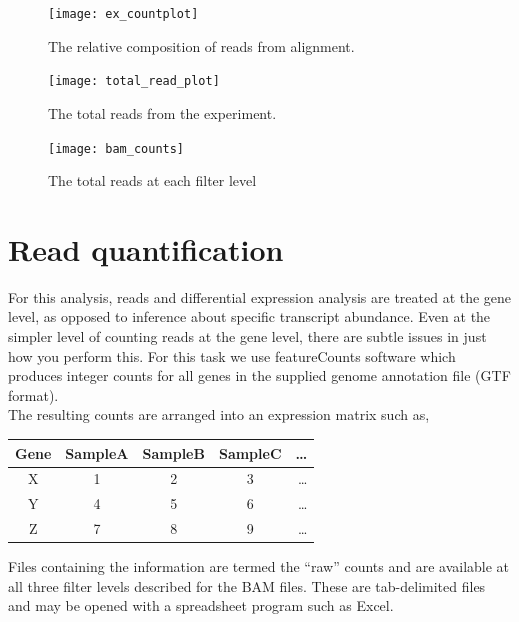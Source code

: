 \documentclass{article}
\begin{document}
\begin{figure}[ht!]
  \centering
    \texttt{[image: ex\_countplot]}
    \caption{The relative composition of reads from alignment.}
    \label{fig:relative_composition}
\end{figure}

\begin{figure}[ht!]
  \centering
    \texttt{[image: total\_read\_plot]}
    \caption{The total reads from the experiment.}
     \label{fig:total_counts}
\end{figure}

\begin{figure}[ht!]
  \centering
    \texttt{[image: bam\_counts]}
    \caption{The total reads at each filter level}
     \label{fig:bam_level_counts}
\end{figure}



\section{Read quantification}

For this analysis, reads and differential expression analysis are treated at the gene level, as opposed to inference about specific transcript abundance.  Even at the simpler level of counting reads at the gene level, there are subtle issues in just how you perform this.  For this task we use featureCounts software \cite{featureCounts} which produces integer counts for all genes in the supplied genome annotation file (GTF format).  \\

The resulting counts are arranged into an expression matrix such as,
\begin{center}
\begin{tabular}{c || c | c | c | r }
  Gene & SampleA & SampleB & SampleC & \ldots \\
  \hline			
  X & 1 & 2 & 3 & \ldots \\
  Y & 4 & 5 & 6 & \ldots\\
  Z & 7 & 8 & 9 & \ldots\\
  \hline  
\end{tabular}
\end{center}

Files containing the information are termed the ``raw'' counts and are available at all three filter levels described for the BAM files.  These are tab-delimited files and may be opened with a spreadsheet program such as Excel.
\end{document}
